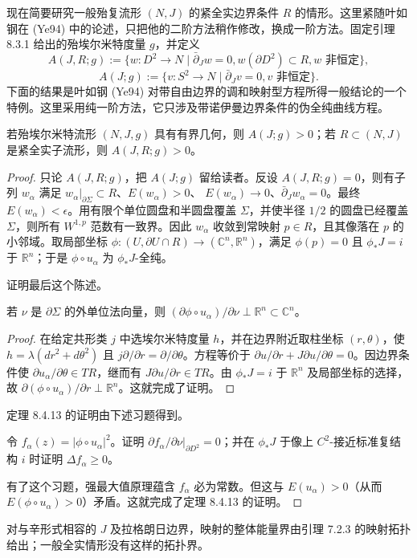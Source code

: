 现在简要研究一般殆复流形 $(N,J)$ 的紧全实边界条件 $R$ 的情形。这里紧随叶如钢在 (Ye94) 中的论述，只把他的二阶方法稍作修改，换成一阶方法。固定引理 8.3.1 给出的殆埃尔米特度量 $g$，并定义
\[
 A(J,R;g):=\{w:D^2\to N\mid\bar\partial_Jw=0, w(\partial D^2)\subset R, w\text{ 非恒定}\},
\]
\[
 A(J;g):=\{v:S^2\to N\mid\bar\partial_Jv=0, v\text{ 非恒定}\}.
\]
下面的结果是叶如钢 (Ye94) 对带自由边界的调和映射型方程所得一般结论的一个特例。这里采用纯一阶方法，它只涉及带诺伊曼边界条件的伪全纯曲线方程。

\begin{theorem}\label{thm:ch8-positive-energy-totally-real}
若殆埃尔米特流形 $(N,J,g)$ 具有有界几何，则 $A(J;g)>0$；若
$R\subset(N,J)$ 是紧全实子流形，则 $A(J,R;g)>0$。
\end{theorem}
\begin{proof}
只论 $A(J,R;g)$，把 $A(J;g)$ 留给读者。反设 $A(J,R;g)=0$，则有子列
$w_\alpha$ 满足 $w_\alpha|_{\partial\Sigma}\subset R$、$E(w_\alpha)>0$、
$E(w_\alpha)\to0$、$\bar\partial_Jw_\alpha=0$。最终
$E(w_\alpha)<\epsilon$。用有限个单位圆盘和半圆盘覆盖 $\Sigma$，并使半径
$1/2$ 的圆盘已经覆盖 $\Sigma$，则所有 $W^{1,p}$ 范数有一致界。因此
$w_\alpha$ 收敛到常映射 $p\in R$，且其像落在 $p$ 的小邻域。取局部坐标
$\phi:(U,\partial U\cap R)\to(\mathbb C^n,\mathbb R^n)$，满足
$\phi(p)=0$ 且 $\phi_*J=i$ 于 $\mathbb R^n$；于是 $\phi\circ u_\alpha$ 为
$\phi_*J$-全纯。

\begin{exercise}\label{ex:ch8-chart-composition-holomorphic}
证明最后这个陈述。
\end{exercise}

\begin{lemma}\label{lem:ch8-normal-derivative-perpendicular}
若 $\nu$ 是 $\partial\Sigma$ 的外单位法向量，则
$(\partial\phi\circ u_\alpha)/\partial\nu\perp\mathbb R^n\subset\mathbb C^n$。
\end{lemma}
\begin{proof}
在给定共形类 $j$ 中选埃尔米特度量 $h$，并在边界附近取柱坐标
$(r,\theta)$，使 $h=\lambda(dr^2+d\theta^2)$ 且
$j\partial/\partial r=\partial/\partial\theta$。方程等价于
$\partial u/\partial r+J\partial u/\partial\theta=0$。因边界条件使
$\partial u_\alpha/\partial\theta\in TR$，继而有
$J\partial u/\partial r\in TR$。由 $\phi_*J=i$ 于 $\mathbb R^n$ 及局部坐标的选择，故
$\partial(\phi\circ u_\alpha)/\partial r\perp\mathbb R^n$。这就完成了证明。
\end{proof}

定理 8.4.13 的证明由下述习题得到。
\begin{exercise}\label{ex:ch8-subharmonic-coordinate-square}
令 $f_\alpha(z)=|\phi\circ u_\alpha|^2$。证明
$\partial f_\alpha/\partial\nu|_{\partial D^2}=0$；并在 $\phi_*J$ 于像上
$C^2$-接近标准复结构 $i$ 时证明 $\Delta f_\alpha\geq0$。
\end{exercise}
有了这个习题，强最大值原理蕴含 $f_\alpha$ 必为常数。但这与
$E(u_\alpha)>0$（从而 $E(\phi\circ u_\alpha)>0$）矛盾。这就完成了定理 8.4.13 的证明。
\end{proof}

\begin{remark}\label{rem:ch8-no-topological-bound-totally-real}
对与辛形式相容的 $J$ 及拉格朗日边界，映射的整体能量界由引理 7.2.3 的映射拓扑给出；一般全实情形没有这样的拓扑界。
\end{remark}
